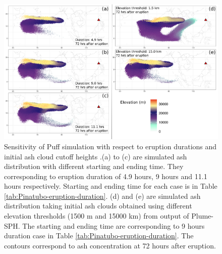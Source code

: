 \documentclass[utf8]{frontiersSCNS} %
\begin{document}
\begin{figure}[!htb]
\centering
\includegraphics[width=0.99 \textwidth]{Figures/duration_cutoff}
\caption{Sensitivity of Puff simulation with respect to eruption durations and initial ash cloud cutoff heights .(a) to (c) are simulated ash distribution with different starting and ending time. They corresponding to eruption duration of 4.9 hours, 9 hours and 11.1 hours respectively. Starting and ending time for each case is in Table \ref{tab:Pinatubo-eruption-duration}. (d) and (e) are simulated ash distribution taking initial ash clouds obtained using different elevation thresholds (1500  m and 15000 km) from output of Plume-SPH. The starting and ending time are corresponding to 9 hours duration case in Table \ref{tab:Pinatubo-eruption-duration}. The contours correspond to ash concentration at 72 hours after eruption.}
\label{fig:Puff-sensitivity-duration-cutoff} 
\end{figure}

\end{document}
